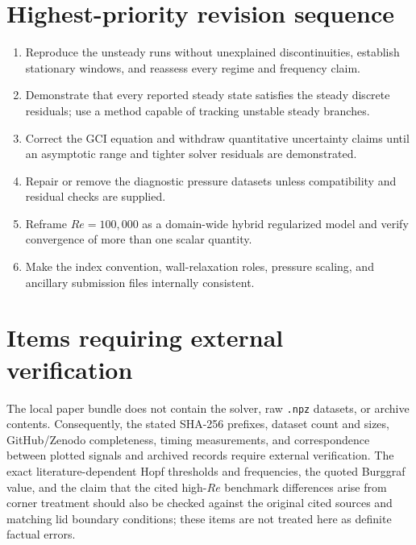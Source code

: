 \documentclass[11pt]{article}
\begin{document}
\section*{Highest-priority revision sequence}

\begin{enumerate}
    \item Reproduce the unsteady runs without unexplained discontinuities, establish stationary windows, and reassess every regime and frequency claim.
    \item Demonstrate that every reported steady state satisfies the steady discrete residuals; use a method capable of tracking unstable steady branches.
    \item Correct the GCI equation and withdraw quantitative uncertainty claims until an asymptotic range and tighter solver residuals are demonstrated.
    \item Repair or remove the diagnostic pressure datasets unless compatibility and residual checks are supplied.
    \item Reframe $Re=100{,}000$ as a domain-wide hybrid regularized model and verify convergence of more than one scalar quantity.
    \item Make the index convention, wall-relaxation roles, pressure scaling, and ancillary submission files internally consistent.
\end{enumerate}

\section*{Items requiring external verification}

The local paper bundle does not contain the solver, raw \texttt{.npz} datasets, or archive contents.  Consequently, the stated SHA-256 prefixes, dataset count and sizes, GitHub/Zenodo completeness, timing measurements, and correspondence between plotted signals and archived records require external verification.  The exact literature-dependent Hopf thresholds and frequencies, the quoted Burggraf value, and the claim that the cited high-$Re$ benchmark differences arise from corner treatment should also be checked against the original cited sources and matching lid boundary conditions; these items are not treated here as definite factual errors.
\end{document}
